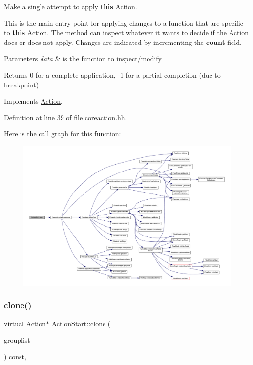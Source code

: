 Make a single attempt to apply {\bfseries{this}} \mbox{\hyperlink{class_action}{Action}}. 

This is the main entry point for applying changes to a function that are specific to {\bfseries{this}} \mbox{\hyperlink{class_action}{Action}}. The method can inspect whatever it wants to decide if the \mbox{\hyperlink{class_action}{Action}} does or does not apply. Changes are indicated by incrementing the {\bfseries{count}} field. 
\begin{DoxyParams}{Parameters}
{\em data} & is the function to inspect/modify \\
\hline
\end{DoxyParams}
\begin{DoxyReturn}{Returns}
0 for a complete application, -\/1 for a partial completion (due to breakpoint) 
\end{DoxyReturn}


Implements \mbox{\hyperlink{class_action_aac1c3999d6c685b15f5d9765a4d04173}{Action}}.



Definition at line 39 of file coreaction.\+hh.

Here is the call graph for this function\+:
\nopagebreak
\begin{figure}[H]
\begin{center}
\leavevmode
\includegraphics[width=350pt]{class_action_start_a9e21953bb17c18610189c3d28b1ab0a9_cgraph}
\end{center}
\end{figure}
\mbox{\label{class_action_start_af8fffe0d933032d6c1e18ef97266d871}} 
\subsubsection{\texorpdfstring{clone()}{clone()}}
{\footnotesize\ttfamily virtual \mbox{\hyperlink{class_action}{Action}}$\ast$ Action\+Start\+::clone (\begin{DoxyParamCaption}\item[{const \mbox{\hyperlink{class_action_group_list}{Action\+Group\+List}} \&}]{grouplist }\end{DoxyParamCaption}) const\hspace{0.3cm}{\ttfamily [inline]}, {\ttfamily [virtual]}}




